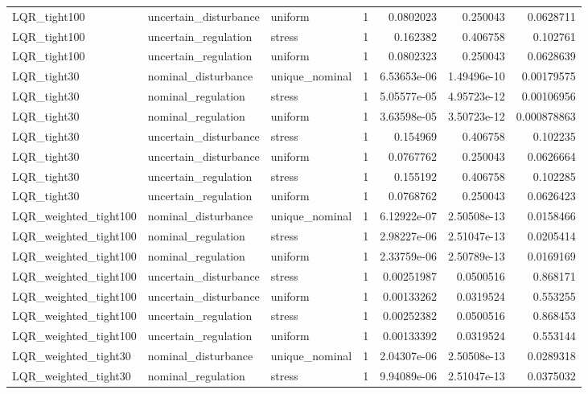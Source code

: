 \begin{tabular}{llllrrr}
LQR\_tight100 & uncertain\_disturbance & uniform & 1 & 0.0802023 & 0.250043 & 0.0628711 \\
LQR\_tight100 & uncertain\_regulation & stress & 1 & 0.162382 & 0.406758 & 0.102761 \\
LQR\_tight100 & uncertain\_regulation & uniform & 1 & 0.0802323 & 0.250043 & 0.0628639 \\
LQR\_tight30 & nominal\_disturbance & unique\_nominal & 1 & 6.53653e-06 & 1.49496e-10 & 0.00179575 \\
LQR\_tight30 & nominal\_regulation & stress & 1 & 5.05577e-05 & 4.95723e-12 & 0.00106956 \\
LQR\_tight30 & nominal\_regulation & uniform & 1 & 3.63598e-05 & 3.50723e-12 & 0.000878863 \\
LQR\_tight30 & uncertain\_disturbance & stress & 1 & 0.154969 & 0.406758 & 0.102235 \\
LQR\_tight30 & uncertain\_disturbance & uniform & 1 & 0.0767762 & 0.250043 & 0.0626664 \\
LQR\_tight30 & uncertain\_regulation & stress & 1 & 0.155192 & 0.406758 & 0.102285 \\
LQR\_tight30 & uncertain\_regulation & uniform & 1 & 0.0768762 & 0.250043 & 0.0626423 \\
LQR\_weighted\_tight100 & nominal\_disturbance & unique\_nominal & 1 & 6.12922e-07 & 2.50508e-13 & 0.0158466 \\
LQR\_weighted\_tight100 & nominal\_regulation & stress & 1 & 2.98227e-06 & 2.51047e-13 & 0.0205414 \\
LQR\_weighted\_tight100 & nominal\_regulation & uniform & 1 & 2.33759e-06 & 2.50789e-13 & 0.0169169 \\
LQR\_weighted\_tight100 & uncertain\_disturbance & stress & 1 & 0.00251987 & 0.0500516 & 0.868171 \\
LQR\_weighted\_tight100 & uncertain\_disturbance & uniform & 1 & 0.00133262 & 0.0319524 & 0.553255 \\
LQR\_weighted\_tight100 & uncertain\_regulation & stress & 1 & 0.00252382 & 0.0500516 & 0.868453 \\
LQR\_weighted\_tight100 & uncertain\_regulation & uniform & 1 & 0.00133392 & 0.0319524 & 0.553144 \\
LQR\_weighted\_tight30 & nominal\_disturbance & unique\_nominal & 1 & 2.04307e-06 & 2.50508e-13 & 0.0289318 \\
LQR\_weighted\_tight30 & nominal\_regulation & stress & 1 & 9.94089e-06 & 2.51047e-13 & 0.0375032 \\

\end{tabular}
